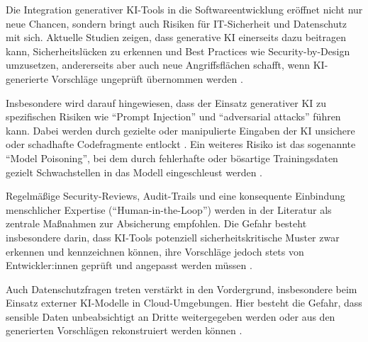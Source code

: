 
Die Integration generativer KI-Tools in die Softwareentwicklung eröffnet nicht
nur neue Chancen, sondern bringt auch Risiken für IT-Sicherheit und Datenschutz
mit sich. Aktuelle Studien zeigen, dass generative KI einerseits dazu beitragen
kann, Sicherheitslücken zu erkennen und Best Practices wie Security-by-Design
umzusetzen, andererseits aber auch neue Angriffsflächen schafft, wenn
KI-generierte Vorschläge ungeprüft übernommen werden
\cite{shi_ai-assisted_2023, alwageed_role_nodate}.

Insbesondere wird darauf hingewiesen, dass der Einsatz generativer KI zu
spezifischen Risiken wie \enquote{Prompt Injection} und \enquote{adversarial
    attacks} führen kann. Dabei werden durch gezielte oder manipulierte Eingaben
der KI unsichere oder schadhafte Codefragmente entlockt
\cite{shi_ai-assisted_2023}. Ein weiteres Risiko ist das sogenannte
\enquote{Model Poisoning}, bei dem durch fehlerhafte oder bösartige
Trainingsdaten gezielt Schwachstellen in das Modell eingeschleust werden
\cite{alwageed_role_nodate}.

Regelmäßige Security-Reviews, Audit-Trails und eine konsequente Einbindung
menschlicher Expertise (\enquote{Human-in-the-Loop}) werden in der Literatur
als zentrale Maßnahmen zur Absicherung empfohlen. Die Gefahr besteht
insbesondere darin, dass KI-Tools potenziell sicherheitskritische Muster zwar
erkennen und kennzeichnen können, ihre Vorschläge jedoch stets von
Entwickler:innen geprüft und angepasst werden müssen
\cite{shi_ai-assisted_2023, alwageed_role_nodate, siebert_generative_2024}.

Auch Datenschutzfragen treten verstärkt in den Vordergrund, insbesondere beim
Einsatz externer KI-Modelle in Cloud-Umgebungen. Hier besteht die Gefahr, dass
sensible Daten unbeabsichtigt an Dritte weitergegeben werden oder aus den
generierten Vorschlägen rekonstruiert werden können
\cite{siebert_generative_2024}.

